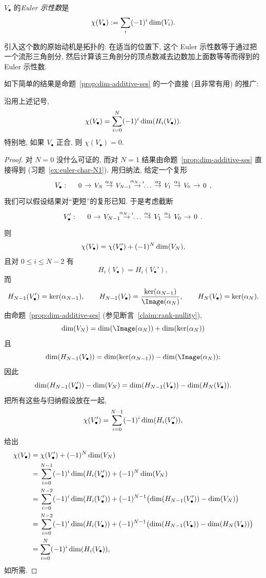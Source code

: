 \begin{definition}\label{def:euler-characteristic}
$V_\bullet$ 的\emph{Euler 示性数}是
\[
\chi(V_\bullet):=\sum_i(-1)^i\operatorname{dim}(V_i).
\]
\end{definition}

引入这个数的原始动机是拓扑的: 在适当的位置下, 这个 Euler 示性数等于通过把一个流形三角剖分, 然后计算该三角剖分的顶点数减去边数加上面数等等而得到的 Euler 示性数.

如下简单的结果是命题~\ref{prop:dim-additive-ses} 的一个直接 (且非常有用) 的推广:

\begin{proposition}\label{prop:euler-characteristic-homology}
沿用上述记号,
\[
\chi(V_\bullet)=\sum_{i=0}^N(-1)^i\operatorname{dim}(H_i(V_\bullet)).
\]
特别地, 如果 $V_\bullet$ 正合, 则 $\chi(V_\bullet)=0$.
\end{proposition}

\begin{proof}
对 $N=0$ 没什么可证的, 而对 $N=1$ 结果由命题~\ref{prop:dim-additive-ses} 直接得到 (习题~\ref{ex:euler-char-N1}). 用归纳法, 给定一个复形
\[
V_\bullet:\quad\begin{tikzcd}[column sep=.9em,font=\small]
0 \ar[r] & V_N \ar[r,"\alpha_N"] & V_{N-1} \ar[r,"\alpha_{N-1}"] & \dots \ar[r,"\alpha_2"] & V_1 \ar[r,"\alpha_1"] & V_0 \ar[r] & 0
\end{tikzcd},
\]
我们可以假设结果对``更短''的复形已知. 于是考虑截断
\[
V_\bullet':\quad\begin{tikzcd}[column sep=.9em]
0 \ar[r] & V_{N-1} \ar[r,"\alpha_{N-1}"] & \dots \ar[r,"\alpha_2"] & V_1 \ar[r,"\alpha_1"] & V_0 \ar[r] & 0
\end{tikzcd}.
\]
则
\[
\chi(V_\bullet)=\chi(V_\bullet')+(-1)^N\operatorname{dim}(V_N),
\]
且对 $0\le i\le N-2$ 有
\[
H_i(V_\bullet)=H_i(V_\bullet'),
\]
而
\[
H_{N-1}(V_\bullet')=\ker(\alpha_{N-1}),\qquad H_{N-1}(V_\bullet)=\frac{\ker(\alpha_{N-1})}{\Image(\alpha_N)},\qquad H_N(V_\bullet)=\ker(\alpha_N).
\]
由命题~\ref{prop:dim-additive-ses} (参见断言~\ref{claim:rank-nullity}),
\[
\Dim(V_N)=\Dim(\Image(\alpha_N))+\Dim(\ker(\alpha_N))
\]
且
\[
\Dim(H_{N-1}(V_\bullet))=\Dim(\ker(\alpha_{N-1}))-\Dim(\Image(\alpha_N));
\]
因此
\[
\operatorname{dim}(H_{N-1}(V_\bullet'))-\operatorname{dim}(V_N)=\operatorname{dim}(H_{N-1}(V_\bullet))-\operatorname{dim}(H_N(V_\bullet)).
\]
把所有这些与归纳假设放在一起,
\[
\chi(V_\bullet')=\sum_{i=0}^{N-1}(-1)^i\operatorname{dim}(H_i(V_\bullet')),
\]
给出
\[
\begin{aligned}
\chi(V_\bullet)&=\chi(V_\bullet')+(-1)^N\operatorname{dim}(V_N)\\
&=\sum_{i=0}^{N-1}(-1)^i\operatorname{dim}(H_i(V_\bullet'))+(-1)^N\operatorname{dim}(V_N)\\
&=\sum_{i=0}^{N-2}(-1)^i\operatorname{dim}(H_i(V_\bullet'))+(-1)^{N-1}\bigl(\operatorname{dim}(H_{N-1}(V_\bullet'))-\operatorname{dim}(V_N)\bigr)\\
&=\sum_{i=0}^{N-2}(-1)^i\operatorname{dim}(H_i(V_\bullet))+(-1)^{N-1}\bigl(\operatorname{dim}(H_{N-1}(V_\bullet))-\operatorname{dim}(H_N(V_\bullet))\bigr)\\
&=\sum_{i=0}^N(-1)^i\operatorname{dim}(H_i(V_\bullet)),
\end{aligned}
\]
如所需.
\end{proof}

